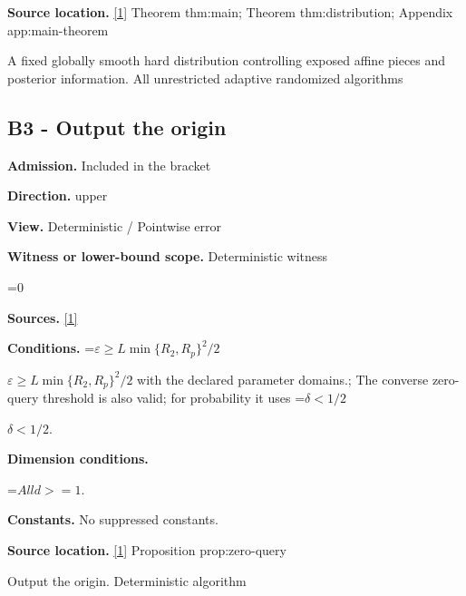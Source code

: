 \documentclass[10pt,a4paper]{article}
\newcommand{\AtlasMath}[1]{\par\begingroup\centering\setbox0=\hbox{$\displaystyle #1$}\ifdim\wd0>1.4\linewidth\typeout{ATLAS WIDE FORMULA: \the\wd0}\fi\ifdim\wd0>\linewidth\resizebox{\linewidth}{!}{\box0}\else\box0\fi\par\endgroup}
\newcommand{\AtlasInlineMath}[1]{\begingroup\setbox0=\hbox{$#1$}\ifdim\wd0>.4\linewidth\endgroup\AtlasMath{#1}\else\endgroup$#1$\fi}
\begin{document}
\textbf{Source location.} \href{https://github.com/WU-Wendao/Colombo/blob/main/colombo_sensorium/Complexity_altas/data/sources/colombo/U02/manuscript.pdf}{[1]} Theorem thm:main; Theorem thm:distribution; Appendix app:main-theorem



A fixed globally smooth hard distribution controlling exposed affine pieces and posterior information. All unrestricted adaptive randomized algorithms



\subsection{B3 - Output the origin}


\textbf{Admission.} Included in the bracket



\textbf{Direction.} upper



\textbf{View.} Deterministic / Pointwise error



\textbf{Witness or lower-bound scope.} Deterministic witness



\AtlasMath{0}


\textbf{Sources.} \href{https://github.com/WU-Wendao/Colombo/blob/main/colombo_sensorium/Complexity_altas/data/sources/colombo/U02/manuscript.pdf}{[1]}



\textbf{Conditions.} \AtlasInlineMath{\varepsilon\ge L\min\{R_2,R_p\}^2/2} with the declared parameter domains.; The converse zero-query threshold is also valid; for probability it uses \AtlasInlineMath{\delta<1/2}.



\textbf{Dimension conditions.}



\AtlasMath{All d>=1.}


\textbf{Constants.} No suppressed constants.



\textbf{Source location.} \href{https://github.com/WU-Wendao/Colombo/blob/main/colombo_sensorium/Complexity_altas/data/sources/colombo/U02/manuscript.pdf}{[1]} Proposition prop:zero-query



Output the origin. Deterministic algorithm
\end{document}
